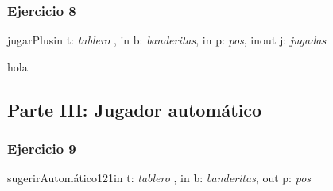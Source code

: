 \documentclass[a4paper]{article}
\begin{document}
\subsubsection{Ejercicio 8}
\begin{addmargin}[4em]{1em}
\begin{proc}{jugarPlus}{in t: \textit{tablero} , in b: \textit{banderitas},
	                    in p: \textit{pos},
	                    inout j: \textit{jugadas}}{}{ hola

}

\end{proc}
\end{addmargin}


\newpage
\subsection{Parte III: Jugador autom\'atico}
\subsubsection{Ejercicio 9}
\begin{addmargin}[4em]{1em}
\begin{proc}{sugerirAutom\'atico121}{in t: \textit{tablero} , in b: \textit{banderitas},
	                                 out p: \textit{pos}}{}{
}

\end{proc}
\end{addmargin}
\end{document}
